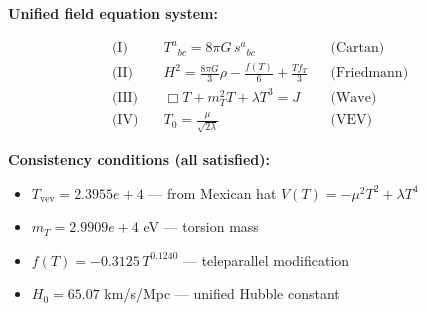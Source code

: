 
\textbf{Unified field equation system:}

\begin{align}
  \text{(I)} \quad & T^a{}_{bc} = 8\pi G \, s^a{}_{bc} && \text{(Cartan)} \\
  \text{(II)} \quad & H^2 = \frac{8\pi G}{3}\rho - \frac{f(T)}{6} + \frac{Tf_T}{3} && \text{(Friedmann)} \\
  \text{(III)} \quad & \Box T + m_T^2 T + \lambda T^3 = J && \text{(Wave)} \\
  \text{(IV)} \quad & T_0 = \frac{\mu}{\sqrt{2\lambda}} && \text{(VEV)}
\end{align}

\textbf{Consistency conditions (all satisfied):}
\begin{itemize}
  \item $T_{\text{vev}} = 2.3955e+4$ — from Mexican hat $V(T) = -\mu^2 T^2 + \lambda T^4$
  \item $m_T = 2.9909e+4$ eV — torsion mass
  \item $f(T) = -0.3125 \, T^{0.1240}$ — teleparallel modification
  \item $H_0 = 65.07$ km/s/Mpc — unified Hubble constant
\end{itemize}